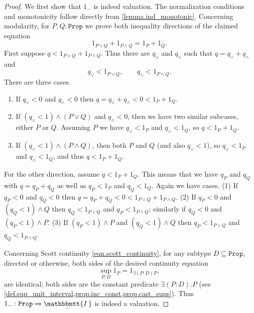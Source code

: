 \documentclass[reqno,11pt]{amsproc}
\theoremstyle{plain}
\theoremstyle{definition}
\newcommand{\Const}[1]{\mathtt{#1}}
\renewcommand{\to}[1][]{\xrightarrow{#1}}
\newcommand{\ubar}[1]{\underaccent{\bar}{#1}}
\newcommand{\ind}[1]{1_{#1}}			%
\newcommand{\inc}{\ind{-}}			%
\newcommand{\internal}[1]{\raisebox{-.03ex}{$\mathbbmtt{#1}$}}
\newcommand{\hs}{\hspace{1pt}}
\newcommand{\tii}{\ubar{\internal{I\hs\hs}}\!\hs}
\newcommand{\prop}{\Const{Prop}}
\numberwithin{equation}{section}
\begin{document}
\begin{proof}
	We first show that $\inc$ is indeed valuation. The normalization conditions and monotonicity follow directly from \cref{lemma.ind_monotonic}. 	Concerning modularity, for $P,Q : \prop$ we prove both inequality directions of the claimed equation
	\[
		\ind{P \lor Q} + \ind{P \land Q} = \ind P + \ind Q.
	\]
	First suppose $q < \ind{P \lor Q} + \ind{P \land Q}$. Thus there are $q_\lor$ and $q_\land$ such that $q = q_\lor + q_\land$ and
	\[
		q_\lor < \ind{P \lor Q}, \qquad q_\land < \ind{P \land Q}.
	\]
	There are three cases.
	\begin{enumerate}[label=(\arabic*)]
		\item If $q_\vee<0$ and $q_\wedge<0$ then $q=q_\vee+q_\wedge<0<\ind P + \ind Q$.
		\item If  $(q_\vee<1)\wedge(P\vee Q)$ and $q_\wedge<0$, then we have two similar subcases, either $P$ or $Q$. Assuming $P$ we have $q_\vee<\ind P$ and $q_\wedge<\ind Q$, so $q<\ind P+\ind Q$.
		\item If $(q_\wedge<1)\wedge(P\wedge Q)$, then both $P$ and $Q$ (and also $q_\vee<1$), so $q_\vee<\ind P$ and $q_\wedge<\ind Q$, and thus $q<\ind P + \ind Q$.
	\end{enumerate}
	
	For the other direction, assume $q < \ind{P} + \ind{Q}$. This means that we have $q_P$ and $q_Q$ with $q = q_P + q_Q$ as well as $q_P < \ind{P}$ and $q_Q < \ind{Q}$. Again we have cases. (1) If $q_P<0$ and $q_Q<0$ then $q=q_P + q_Q<0<\ind{P \lor Q} + \ind{P \land Q}$. (2) If $q_P<0$ and $(q_Q<1)\wedge Q$ then $q_Q<\ind{P\vee Q}$ and $q_P<\ind{P\wedge Q}$; similarly if $q_Q<0$ and $(q_P<1)\wedge P$. (3) If $(q_P<1)\wedge P$ and $(q_Q<1)\wedge Q$ then $q_P<\ind{P\vee Q}$ and $q_Q<\ind{P\wedge Q}$.
	
	

	Concerning Scott continuity \eqref{eqn.scott_continuity}, for any subtype $D \subseteq \prop$, directed or otherwise, both sides of the desired continuity equation
	\[
		\sup_{P : D} \ind{P} = \ind{\exists (P:D) P},
	\]
	are identical; both sides are the constant predicate $\exists(P:D).P$ (see \cref{def.sup_unit_interval,prop.inc_const,prop.cast_sups}). Thus $\inc : \prop \to \tii$ is indeed a valuation.
\end{proof}
\end{document}

